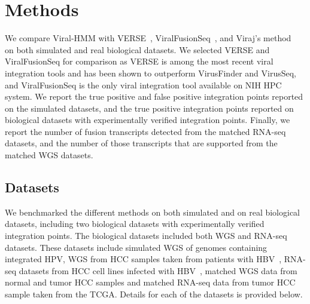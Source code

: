 \documentclass{bioinfo}
\begin{document}

\section{Methods}
We compare Viral-HMM with VERSE~\cite{Wang2015}, ViralFusionSeq~\cite{Li2013}, and Viraj's method~\cite{Unknown} on both simulated and real biological datasets.  We selected VERSE and ViralFusionSeq for comparison as VERSE is among the most recent viral integration tools and has been shown to outperform VirusFinder and VirusSeq, and ViralFusionSeq is the only viral integration tool available on NIH HPC system.  We report the true positive and false positive integration points reported on the simulated datasets, and the true positive integration points reported on biological datasets with experimentally verified integration points.  Finally, we report the number of fusion transcripts detected from the matched RNA-seq datasets, and the number of those transcripts that are supported from the matched WGS datasets.

\subsection{Datasets}
We benchmarked the different methods on both simulated and on real biological datasets, including two biological datasets with experimentally verified integration points.  The biological datasets included both WGS and RNA-seq datasets. These datasets include simulated WGS of genomes containing integrated HPV, WGS from HCC samples taken from patients with HBV~\cite{Sung2012}, RNA-seq datasets from HCC cell lines infected with HBV~\cite{Lau2014}, matched WGS data from normal and tumor HCC samples and matched RNA-seq data from tumor HCC sample taken from the TCGA.  Details for each of the datasets is provided below.  
\end{document}
